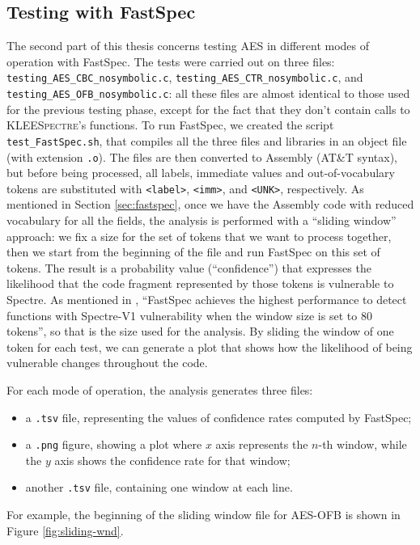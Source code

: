 \documentclass[target=mst,aauheader=aics]{thud}
\theoremstyle{definition}
\begin{document}
	\subsection{Testing with FastSpec}
	The second part of this thesis concerns testing AES in different modes of operation with FastSpec. The tests were carried out on three files: \texttt{testing\_AES\_CBC\_nosymbolic.c}, \texttt{testing\_AES\_CTR\_nosymbolic.c}, and \texttt{testing\_AES\_OFB\_nosymbolic.c}: all these files are almost identical to those used for the previous testing phase, except for the fact that they don't contain calls to \textsc{KLEESpectre}'s functions. To run FastSpec, we created the script \texttt{test\_FastSpec.sh}, that compiles all the three files and libraries in an object file (with extension \texttt{.o}). The files are then converted to Assembly (AT\&T syntax), but before being processed, all labels, immediate values and out-of-vocabulary tokens are substituted with \texttt{<label>}, \texttt{<imm>}, and \texttt{<UNK>}, respectively. As mentioned in Section \ref{sec:fastspec}, once we have the Assembly code with reduced vocabulary for all the fields, the analysis is performed with a ``sliding window'' approach: we fix a size for the set of tokens that we want to process together, then we start from the beginning of the file and run FastSpec on this set of tokens. The result is a probability value (``confidence'') that expresses the likelihood that the code fragment represented by those tokens is vulnerable to Spectre. As mentioned in \cite{Tol2021}, ``FastSpec achieves the highest performance to detect functions with Spectre-V1 vulnerability when the window size is set to 80 tokens'', so that is the size used for the analysis. By sliding the window of one token for each test, we can generate a plot that shows how the likelihood of being vulnerable changes throughout the code. 
	
	For each mode of operation, the analysis generates three files:
	\begin{itemize}
		\item a \texttt{.tsv} file, representing the values of confidence rates computed by FastSpec;
		\item a \texttt{.png} figure, showing a plot where $x$ axis represents the $n$-th window, while the $y$ axis shows the confidence rate for that window;
		\item another \texttt{.tsv} file, containing one window at each line.
	\end{itemize}
	
	For example, the beginning of the sliding window file for AES-OFB is shown in Figure \ref{fig:sliding-wnd}.
	
\end{document}
